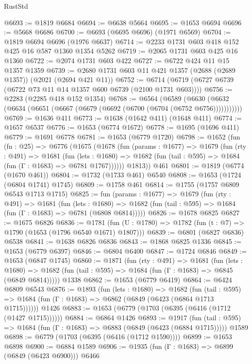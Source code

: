 \begin{lexlean}{RustStd}
\begin{coremodule}
@6693 := @1819 @6684
@6694 := @6638 @5664
@6695 := @1653 @6694
@6696 := @5668 @6686
@6700 := @6693 (@6695 @6696) (@1971 @6569)
@6704 := @1819 @6694 @6696 (@1976 @6637)
@6714 := @2233 @1731 @603 @418 @152 @425 @16 @587 @1360 @1354 @5262
@6719 := @2065 @1731 @603 @425 @16 @1360
@6722 := @2074 @1731 @603 @422
@6727 := @6722 @424 @11 @15 @1357 @1359
@6739 := @2680 @1731 @603 @11 @421 @1357 (@2688 (@2689 @1357)) (@2021 (@2694 @421 @11))
@6752 := @6714 (@6719 (@6727 @6739 (@6722 @73 @11 @14 @1357 @600 @6739 (@2100 @1731 @603))))
@6756 := @2283 (@2285 @418 @152 @1354)
@6768 := @6564
    (@6589 (@6630 (@6632 (@6634 (@6651 (@6667 (@6679 (@6692 (@6700 (@6704 (@6752 @6756)))))))))))
@6769 := @1636 @411
@6773 := @1638 (@1642 @411) (@1648 @411)
@6774 := @1657 @6537
@6776 := @1653 (@6774 @1672)
@6778 := @1695 (@1696 @411)
@6779 := @1691 @6778
@6781 := @1653 (@6779 @1720)
@6798 := @1652
    (fun (fn : @25) =>
    @6776
      (@1675
        (@1678
          (fun (params : @1677) =>
          @1679
            (fun (rty : @491) =>
            @1681
              (fun (lets : @1680) =>
              @1682 (fun (tail : @595) => @1684 (fun (Γ : @1683) => @6781 @1767))))))
        @1813))
    @461
@6801 := @1819 (@6774 (@1670 @461))
@6804 := @1732 (@1733 @461) @6540
@6808 := @1653 (@1724 (@6804 @1741) @1745)
@6809 := @1758 @461
@6814 := @1755 (@1757 @6809 @6543 @1713 @1715)
@6825 := fun (params : @1677) =>
  @1679
    (fun (rty : @491) =>
    @1681
      (fun (lets : @1680) =>
      @1682 (fun (tail : @595) => @1684 (fun (Γ : @1683) => @6781 (@6808 @6814)))))
@6826 := @1678 @6825
@6827 := @1675 @6826
@6836 := @1781 (fun (U : @1780) => @1782 (fun (t : @7) => @1790 (@1653 (@1796 @6540 @1671) @1807)))
@6839 := @6801 (@6827 @6836) @6538
@6841 := @1638 @6826 @6836
@6843 := @1868 @6825 @1336
@6845 := @1653 (@6779 @6397)
@6846 := @6804 @6400
@6847 := @1724 @6846
@6849 := @1653 (@6847 @1745)
@6860 := @1871
    (fun (rty : @491) =>
    @1681
      (fun (lets : @1680) =>
      @1682 (fun (tail : @595) => @1684 (fun (Γ : @1683) => @6845 (@6849 @6814)))))
    @1338
@6862 := @1653 (@6779 @6419)
@6864 := @6424 @6809 @6543
@6876 := @1893
    (fun (lets : @1680) =>
    @1682
      (fun (tail : @595) => @1684 (fun (Γ : @1683) => @6862 (@6849 (@6423 (@6864 @1713 @1715))))))
    @1426
@6883 := @1653 (@6779 (@1703 (@6395 (@6416 (@1712 (@1427 @1715))))))
@6884 := @6864 @1426
@6893 := @1917
    (fun (tail : @595) => @1684 (fun (Γ : @1683) => @6883 (@6849 (@6423 (@6884 @1715)))))
    @1589
@6898 := @6779 (@1703 (@6395 (@6416 (@1712 @1590))))
@6899 := @1653 @6898
@6900 := @6884 @1589
@6906 := @1935 (fun (Γ : @1683) => @6899 (@6849 (@6423 @6900))) @6466

\end{coremodule}
\end{lexlean}
